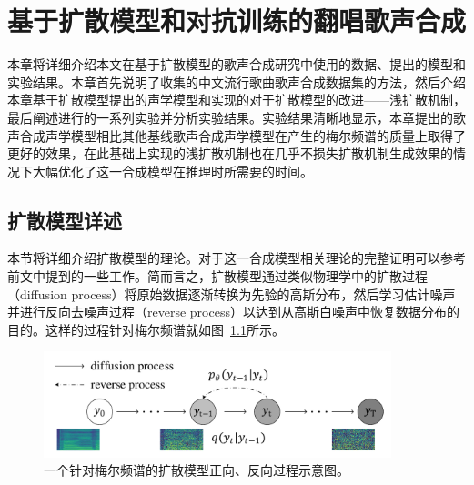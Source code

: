 \newcommand{\etal}{\textit{et al}.}
\newcommand{\ie}{\textit{i}.\textit{e}.}
\newcommand{\vardbtilde}[1]{\tilde{\raisebox{0pt}[0.85\height]{$\tilde{#1}$}}}
\newcommand{\defeq}{\coloneqq}
\newcommand{\grad}{\nabla}
\newcommand{\E}{\mathbb{E}}
\newcommand{\Var}{\mathrm{Var}}
\newcommand{\Cov}{\mathrm{Cov}}
\newcommand{\Ea}[1]{\E\left[#1\right]}
\newcommand{\Eb}[2]{\E_{#1}\!\left[#2\right]}
\newcommand{\Vara}[1]{\Var\left[#1\right]}
\newcommand{\Varb}[2]{\Var_{#1}\left[#2\right]}
\newcommand{\kl}[2]{D_{\mathrm{KL}}\!\left(#1 ~ \| ~ #2\right)}
\newcommand{\pdata}{{p_\mathrm{data}}}
\newcommand{\bA}{\mathbf{A}}
\newcommand{\bI}{\mathbf{I}}
\newcommand{\bJ}{\mathbf{J}}
\newcommand{\bH}{\mathbf{H}}
\newcommand{\bL}{\mathbf{L}}
\newcommand{\bM}{\mathbf{M}}
\newcommand{\bQ}{\mathbf{Q}}
\newcommand{\bR}{\mathbf{R}}
\newcommand{\bzero}{\mathbf{0}}
\newcommand{\bone}{\mathbf{1}}
\newcommand{\bb}{\mathbf{b}}
\newcommand{\bu}{\mathbf{u}}
\newcommand{\bv}{\mathbf{v}}
\newcommand{\bw}{\mathbf{w}}
\newcommand{\bx}{\mathbf{x}}
\newcommand{\by}{\mathbf{y}}
\newcommand{\bz}{\mathbf{z}}
\newcommand{\bxh}{\hat{\mathbf{x}}}
\newcommand{\btheta}{{\boldsymbol{\theta}}}
\newcommand{\bphi}{{\boldsymbol{\phi}}}
\newcommand{\bepsilon}{{\boldsymbol{\epsilon}}}
\newcommand{\bmu}{{\boldsymbol{\mu}}}
\newcommand{\bnu}{{\boldsymbol{\nu}}}
\chapter{基于扩散模型和对抗训练的翻唱歌声合成}
\label{sec:svs}
本章将详细介绍本文在基于扩散模型的歌声合成研究中使用的数据、提出的模型和实验结果。本章首先说明了收集的中文流行歌曲歌声合成数据集的方法，然后介绍本章基于扩散模型提出的声学模型和实现的对于扩散模型的改进——浅扩散机制，最后阐述进行的一系列实验并分析实验结果。实验结果清晰地显示，本章提出的歌声合成声学模型相比其他基线歌声合成声学模型在产生的梅尔频谱的质量上取得了更好的效果，在此基础上实现的浅扩散机制也在几乎不损失扩散机制生成效果的情况下大幅优化了这一合成模型在推理时所需要的时间。
\section{扩散模型详述}
本节将详细介绍扩散模型的理论。对于这一合成模型相关理论的完整证明可以参考前文中提到的一些工作\citep{Ho2020ddpm,kong2021diffwave,song2021denoising}。简而言之，扩散模型通过类似物理学中的扩散过程（diffusion process）将原始数据逐渐转换为先验的高斯分布，然后学习估计噪声并进行反向去噪声过程（reverse process）以达到从高斯白噪声中恢复数据分布的目的。这样的过程针对梅尔频谱就如图~\ref{fig:two_process}所示。
\begin{figure}[!h]
	\centering
	\includegraphics[width=0.90\textwidth]{figure/svs/diffusion-new.pdf}
	\caption{一个针对梅尔频谱的扩散模型正向、反向过程示意图。}
	\label{fig:two_process}
\end{figure}
